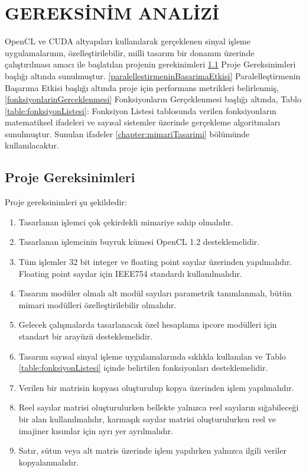 \chapter{GEREKSİNİM ANALİZİ} \label{chapter:gereksinimAnalizi}
OpenCL ve CUDA altyapıları kullanılarak gerçeklenen sinyal işleme uygulamalarının, özelleştirilebilir, milli tasarım bir donanım üzerinde çalıştırılması amacı ile başlatılan projenin gerekinimleri \ref{projeGereksinimleri} Proje Gereksinimleri başlığı altında sunulmuştur. \ref{paralellestirmeninBasarimaEtkisi} Paralelleştirmenin Başarıma Etkisi başlığı altında proje için performans metrikleri belirlenmiş, \ref{fonksiyonlarinGerceklenmesi} Fonksiyonların Gerçeklenmesi başlığı altında, Tablo \ref{table:fonksiyonListesi}: Fonksiyon Listesi tablosunda verilen fonksiyonların matematiksel ifadeleri ve sayısal sistemler üzerinde gerçekleme algoritmaları sunulmuştur. Sunulan ifadeler \ref{chapter:mimariTasarimi} bölümünde kullanılacaktır. 

\section{Proje Gereksinimleri} \label{projeGereksinimleri}
 Proje gereksinimleri şu şekildedir: 
\begin{enumerate}
  \item Tasarlanan işlemci çok çekirdekli mimariye sahip olmalıdır.
  \item Tasarlanan işlemcinin buyruk kümesi OpenCL 1.2 desteklemelidir. 
  \item Tüm işlemler 32 bit integer ve floating point sayılar üzerinden yapılmalıdır. Floating point sayılar için IEEE754 standardı kullanılmalıdır.
  \item Tasarım modüler olmalı alt modül sayıları parametrik tanımlanmalı, bütün mimari modülleri özelleştirilebilir olmalıdır. 
  \item Gelecek çalışmalarda tasarlanacak özel hesaplama ipcore modülleri için standart bir arayüzü desteklemelidir.
  \item Tasarım sayısal sinyal işleme uygulamalarında sıklıkla kullanılan ve Tablo \ref{table:fonksiyonListesi} içinde belirtilen fonksiyonları desteklemelidir.
  \item Verilen bir matrisin kopyası oluşturulup kopya üzerinden işlem yapılmalıdır.
  \item Reel sayılar matrisi oluşturulurken bellekte yalnızca reel sayıların sığabileceği bir alan kullanılmalıdır, karmaşık sayılar matrisi oluşturulurken reel ve imajiner kısımlar için ayrı yer ayrılmalıdır.
  \item Satır, sütun veya alt matris üzerinde işlem yapılırken yalnızca ilgili veriler kopyalanmalıdır.
  \newpage
  	
  
\end{enumerate}

